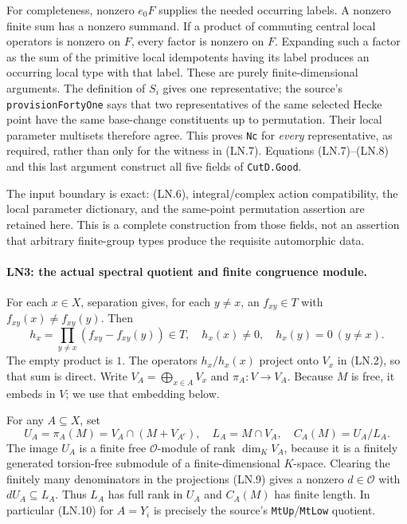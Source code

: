 For completeness, nonzero $e_0F$ supplies the needed occurring
labels.  A nonzero finite sum has a nonzero summand.  If a product of
commuting central local operators is nonzero on $F$, every factor
is nonzero on $F$.  Expanding such a factor as the sum of the
primitive local idempotents having its label produces an occurring
local type with that label.  These are purely finite-dimensional
arguments.  The definition of $S_i$ gives one representative;
the source's \texttt{provisionFortyOne} says that two representatives
of the same selected Hecke point have the same base-change
constituents up to permutation.  Their local parameter multisets
therefore agree.  This proves \texttt{Nc} for \emph{every}
representative, as required, rather than only for the witness in
(LN.7).  Equations (LN.7)--(LN.8) and this last argument construct
all five fields of \texttt{CutD.Good}.

The input boundary is exact: (LN.6), integral/complex action
compatibility, the local parameter dictionary, and the
same-point permutation assertion are retained here.  This is a
complete construction from those fields, not an assertion that
arbitrary finite-group types produce the requisite automorphic data.

\paragraph{LN3: the actual spectral quotient and finite congruence module.}
\label{claim:LN3}
For each $x\in X$, separation gives, for each $y\ne x$, an
$f_{xy}\in T$ with $f_{xy}(x)\ne f_{xy}(y)$.  Then
\[
 h_x=\prod_{y\ne x}(f_{xy}-f_{xy}(y))\in T,
 \quad h_x(x)\ne0,\quad h_x(y)=0\ (y\ne x).          \tag{LN.9}
\]
The empty product is $1$.  The operators $h_x/h_x(x)$ project onto
$V_x$ in (LN.2), so that sum is direct.  Write
$V_A=\bigoplus_{x\in A}V_x$ and $\pi_A:V\to V_A$.
Because $M$ is free, it embeds in $V$; we use that embedding below.

For any $A\subseteq X$, set
\[
 U_A=\pi_A(M)=V_A\cap(M+V_{A^c}),\quad
 L_A=M\cap V_A,\quad C_A(M)=U_A/L_A.                 \tag{LN.10}
\]
The image $U_A$ is a finite free $\mathcal O$-module of rank
$\dim_KV_A$, because it is a finitely generated torsion-free
submodule of a finite-dimensional $K$-space.  Clearing the finitely
many denominators in the projections (LN.9) gives a nonzero
$d\in\mathcal O$ with $dU_A\subseteq L_A$.  Thus $L_A$ has full
rank in $U_A$ and $C_A(M)$ has finite length.  In particular (LN.10)
for $A=Y_i$ is precisely the source's
\texttt{MtUp}/\texttt{MtLow} quotient.

